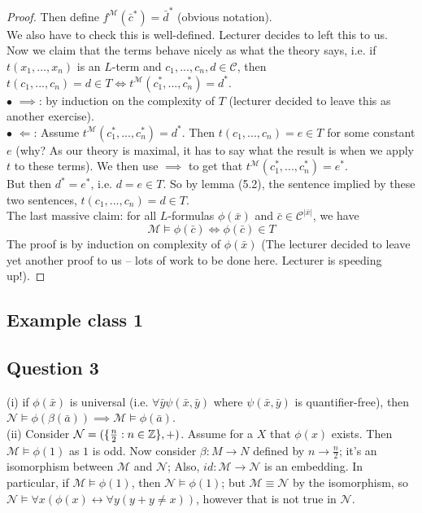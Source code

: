 \documentclass[a4paper]{article}
\begin{document}
\begin{lemma}
\begin{proof}
        Then define $f^{\mathcal{M}}(\bar{c}^*) = \bar{d}^*$ (obvious notation).\\
        We also have to check this is well-defined. Lecturer decides to left this to us.\\
        Now we claim that the terms behave nicely as what the theory says, i.e. if $t(x_1,...,x_n)$ is an $L$-term and $c_1,...,c_n,d \in \mathcal{C}$, then $t(c_1,...,c_n) = d \in T \iff t^{\mathcal{M}} (c_1^*,...,c_n^*) = d^*$.\\
        $\bullet$ $\implies$: by induction on the complexity of $T$ (lecturer decided to leave this as another exercise).\\
        $\bullet$ $\Leftarrow$: Assume $t^{\mathcal{M}} (c_1^*,...,c_n^*) = d^*$. Then $t(c_1,...,c_n) = e \in T$ for some constant $e$ (why? As our theory is maximal, it has to say what the result is when we apply $t$ to these terms). We then use $\implies$ to get that $t^{\mathcal{M}}(c_1^*,...,c_n^*) = e^*$.\\
        But then $d^* = e^*$, i.e. $d = e \in T$. So by lemma (5.2), the sentence implied by these two sentences, $t(c_1,...,c_n) = d \in T$.\\
        The last massive claim: for all $L$-formulas $\phi(\bar{x})$ and $\bar{c} \in \mathcal{C}^{|\bar{x}|}$, we have
        $$\mathcal{M} \vDash \phi(\bar{c}) \iff \phi(\bar{c}) \in T$$
        The proof is by induction on complexity of $\phi(\bar{x})$ (The lecturer decided to leave yet another proof to us -- lots of work to be done here. Lecturer is speeding up!).
    \end{proof}
\end{lemma}

\newpage

\subsection{Example class 1}

\subsection{Question 3}
(i) if $\phi(\bar{x})$ is universal (i.e. $\forall \bar{y} \psi(\bar{x},\bar{y})$ where $\psi(\bar{x},\bar{y})$ is quantifier-free), then $\mathcal{N} \vDash \phi(\beta(\bar{a})) \implies \mathcal{M} \vDash \phi(\bar{a})$.\\
(ii) Consider $\mathcal{N} = (\{\frac{n}{2} : n \in \mathbb{Z} \},+)$. Assume for a $X$ that $\phi(x)$ exists. Then $\mathcal{M} \vDash \phi(1)$ as $1$ is odd. Now consider $\beta:M \to N$ defined by $n \to \frac{n}{2}$; it's an isomorphism between $\mathcal{M}$ and $\mathcal{N}$; Also, $id:\mathcal{M} \to \mathcal{N}$ is an embedding. In particular, if $\mathcal{M} \vDash \phi(1)$, then $\mathcal{N} \vDash \phi(1)$; but $\mathcal{M} \equiv \mathcal{N}$ by the isomorphism, so $\mathcal{N} \vDash \forall x (\phi(x) \leftrightarrow \forall y (y +y \neq x))$, however that is not true in $\mathcal{N}$.
\end{document}
